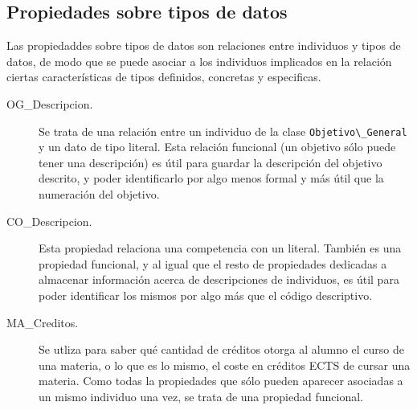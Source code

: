 	\subsection{Propiedades sobre tipos de datos}
	Las propiedaddes sobre tipos de datos son relaciones entre individuos y tipos de datos, de modo que se puede asociar a los individuos implicados en la relación ciertas características de tipos definidos, concretas y especificas.
  
	\begin{description}
		\item [OG\_Descripcion.] Se trata de una relación entre un individuo de la clase \lstinline!Objetivo\_General! y un dato de tipo literal. Esta relación funcional (un objetivo sólo puede tener una descripción) es útil para guardar la descripción del objetivo descrito, y poder identificarlo por algo menos formal y más útil que la numeración del objetivo.
   		

	   \item [CO\_Descripcion.] Esta propiedad relaciona una competencia con un literal. También es una propiedad funcional, y al igual que el resto de propiedades dedicadas a almacenar información acerca de descripciones de individuos, es útil para poder identificar los mismos por algo más que el código descriptivo.
   		
  
	   	\item [MA\_Creditos.] Se utliza para saber qué cantidad de créditos otorga al alumno el curso de una materia, o lo que es lo mismo, el coste en créditos ECTS de cursar una materia. Como todas la propiedades que sólo pueden aparecer asociadas a un mismo individuo una vez, se trata de una propiedad funcional.
   		 
   

\end{description}
